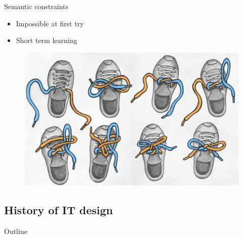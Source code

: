 \documentclass{beamer}
\begin{document}
\begin{frame}{Semantic constraints}
    \begin{itemize}
    \item Impossible at first try
    \item Short term learning
    \end{itemize}
    \begin{figure}
    \includegraphics[scale=0.4]{tie_your_shoes.jpg}
    \end{figure}
\end{frame}

\subsection{History of IT design}

\begin{frame}{Outline}
\end{frame}
\end{document}
